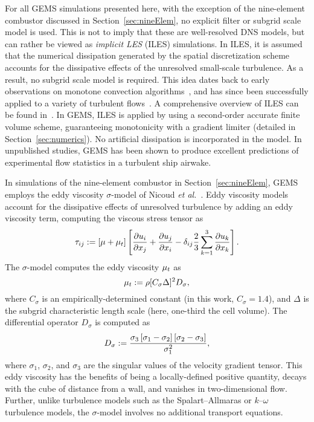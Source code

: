 For all GEMS simulations presented here, with the exception of the nine-element combustor discussed in Section~\ref{sec:nineElem}, no explicit filter or subgrid scale model is used. This is not to imply that these are well-resolved DNS models, but can rather be viewed as \textit{implicit LES} (ILES) simulations. In ILES, it is assumed that the numerical dissipation generated by the spatial discretization scheme accounts for the dissipative effects of the unresolved small-scale turbulence. As a result, no subgrid scale model is required. This idea dates back to early observations on monotone convection algorithms~\cite{Boris1989}, and has since been successfully applied to a variety of turbulent flows~\cite{Porter1994,Grinstein2005,Bensow2010}. A comprehensive overview of ILES can be found in~\cite{ilesBook}. In GEMS, ILES is applied by using a second-order accurate finite volume scheme, guaranteeing monotonicity with a gradient limiter (detailed in Section~\ref{sec:numerics}). No artificial dissipation is incorporated in the model. In unpublished studies, GEMS has been shown to produce excellent predictions of experimental flow statistics in a turbulent ship airwake.

In simulations of the nine-element combustor in Section~\ref{sec:nineElem}, GEMS employs the eddy viscosity $\sigma$-model of Nicoud \textit{et al.}~\cite{Nicoud2011}. Eddy viscosity models account for the dissipative effects of unresolved turbulence by adding an eddy viscosity term, computing the viscous stress tensor as
%
\begin{equation}
	\tau_{i j} := \left[\mu + \mu_{t}\right] \left[ \frac{\partial u_{i}}{\partial x_{j}} + \frac{\partial u_{j}}{\partial x_{i}} - \delta_{i j} \frac{2}{3} \sum_{k=1}^3 \frac{\partial u_{k}}{\partial x_{k}} \right].
\end{equation}
%
The $\sigma$-model computes the eddy viscosity $\mu_{t}$ as
%
\begin{equation}
	\mu_{t} := \rho [C_{\sigma} \Delta]^2 D_{\sigma},
\end{equation}
%
where $C_{\sigma}$ is an empirically-determined constant (in this work, $C_{\sigma} = 1.4$), and $\Delta$ is the subgrid characteristic length scale (here, one-third the cell volume). The differential operator $D_{\sigma}$ is computed as
%
\begin{equation}
	D_{\sigma} := \frac{\sigma_3\left[\sigma_1 - \sigma_2\right]\left[\sigma_2 - \sigma_3\right]}{\sigma_1^2},
\end{equation}
%
where $\sigma_1$, $\sigma_2$, and $\sigma_3$ are the singular values of the velocity gradient tensor. This eddy viscosity has the benefits of being a locally-defined positive quantity, decays with the cube of distance from a wall, and vanishes in two-dimensional flow. Further, unlike turbulence models such as the Spalart--Allmaras or $k$--$\omega$ turbulence models, the $\sigma$-model involves no additional transport equations.


